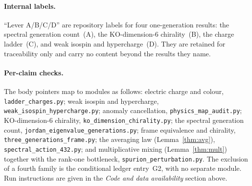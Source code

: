 \documentclass[11pt,a4paper]{article}
\theoremstyle{plain}
\newcommand{\code}[1]{\texttt{#1}}
\begin{document}
\paragraph{Internal labels.}
``Lever A/B/C/D'' are repository labels for four one-generation results: the
spectral generation count~(A), the KO-dimension-6 chirality~(B), the charge
ladder~(C), and weak isospin and hypercharge~(D). They are retained for
traceability only and carry no content beyond the results they name.

\paragraph{Per-claim checks.}
The body pointers map to modules as follows: electric charge and colour,
\code{ladder\_charges.py}; weak isospin and hypercharge,
\code{weak\_isospin\_hypercharge.py}; anomaly cancellation,
\code{physics\_map\_audit.py}; KO-dimension-6 chirality,
\code{ko\_dimension\_chirality.py}; the spectral generation count,
\code{jordan\_eigenvalue\_generations.py}; frame equivalence and chirality,
\code{three\_generations\_frame.py}; the averaging law (Lemma~\ref{thm:avg}),
\code{spectral\_action\_432.py}; and multiplicative mixing (Lemma~\ref{thm:mult})
together with the rank-one bottleneck, \code{spurion\_perturbation.py}. The
exclusion of a fourth family is the conditional ledger entry~G2, with no separate
module. Run instructions are given in the \emph{Code and data availability}
section above.
\end{document}
